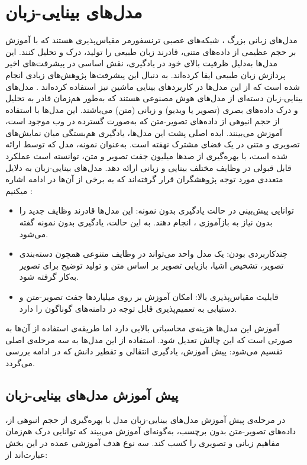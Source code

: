 \section{مدل‌های بینایی-زبان}
مدل‌های زبانی بزرگ
،
شبکه‌های عصبی ترنسفورمر مقیاس‌پذیری هستند که با آموزش بر حجم عظیمی از داده‌های متنی، قادرند زبان طبیعی را تولید، درک و تحلیل کنند. این مدل‌ها به‌دلیل ظرفیت بالای خود در یادگیری، نقش اساسی در پیشرفت‌های اخیر پردازش زبان طبیعی
ایفا کرده‌اند. به دنبال این پیشرفت‌ها پژوهش‌های زیادی انجام شده است که از این مدل‌ها در کاربردهای بینایی ماشین نیز استفاده کرده‌اند
\cite{17}.
مدل‌های بینایی-زبان
 دسته‌ای از مدل‌های هوش مصنوعی هستند که به‌طور هم‌زمان قادر به تحلیل و درک داده‌های بصری (تصویر یا ویدیو) و زبانی (متن) می‌باشند. این مدل‌ها با استفاده از حجم انبوهی از داده‌های تصویر-متن که به‌صورت گسترده در وب موجود است، آموزش می‌بینند. ایده اصلی پشت این مدل‌ها، یادگیری هم‌بستگی میان نمایش‌های تصویری و متنی در یک فضای مشترک نهفته 
 است.
  به‌عنوان نمونه، مدل 
\cite{clip}
که توسط  ارائه شده است، با بهره‌گیری از صدها میلیون جفت تصویر و متن، توانسته است عملکرد قابل قبولی در وظایف مختلف بینایی و زبانی ارائه دهد.
مدل‌های بینایی-زبان به دلایل متعددی مورد توجه پژوهشگران قرار گرفته‌اند که به برخی از آن‌ها در ادامه اشاره میکنیم
\cite{17}:
\begin{itemize}
\item توانایی پیش‌بینی در حالت یادگیری بدون نمونه:
  این مدل‌ها قادرند وظایف جدید را بدون نیاز به بازآموزی
  ،
   انجام دهند.
 به این حالت، یادگیری بدون نمونه
گفته می‌شود.
\item چندکاربردی بودن:
یک مدل واحد می‌تواند در وظایف متنوعی همچون دسته‌بندی تصویر، تشخیص اشیا، بازیابی تصویر بر اساس متن و تولید توضیح برای تصویر به‌کار گرفته شود.
\item قابلیت مقیاس‌پذیری بالا:
امکان آموزش بر روی میلیاردها جفت تصویر-متن و دستیابی به تعمیم‌پذیری قابل توجه در دامنه‌های گوناگون را دارد.

\end{itemize}
آموزش این مدل‌ها هزینه‌ی محاسباتی بالایی دارد اما طریقه‌ی استفاده از آن‌ها به صورتی است که این چالش تعدیل شود.
استفاده از این مدل‌ها به سه مرحله‌ی اصلی تقسیم می‌شود: پیش آموزش، یادگیری انتقالی و تقطیر دانش که در ادامه بررسی می‌گردد.

\subsection{پیش آموزش مدل‌های بینایی-زبان}
،در مرحله‌ی پیش آموزش مدل‌های بینایی-زبان
مدل با بهره‌گیری از حجم انبوهی از داده‌های تصویر-متن بدون برچسب، به‌گونه‌ای آموزش می‌بیند که توانایی درک هم‌زمان مفاهیم زبانی و تصویری را کسب کند. سه نوع هدف آموزشی عمده در این بخش عبارت‌اند از:
